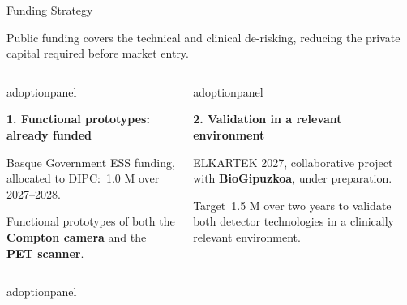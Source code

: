 \documentclass[aspectratio=169,11pt]{beamer}
\newcommand{\hi}[1]{\textcolor{crRed}{#1}}
\begin{document}
\begin{frame}{Funding Strategy}

{\small Public funding covers the technical and clinical de-risking, \hi{reducing the private capital required before market entry}.\par}
\vspace{0.16cm}
\begin{columns}[T,onlytextwidth]
\begin{beamercolorbox}[sep=6pt,wd=\linewidth]{adoptionpanel}
\begin{minipage}[t][2.0cm][t]{\linewidth}\raggedright
{\footnotesize\bfseries\color{crBlue}1. Functional prototypes: already funded\par}
\vspace{0.07cm}
{\scriptsize Basque Government ESS funding, \hi{allocated to DIPC}: \EUR\,1.0 M over 2027--2028.\par\vspace{0.06cm}
Functional prototypes of both the \textbf{Compton camera} and the \textbf{PET scanner}.\par}
\end{minipage}
\end{beamercolorbox}
\begin{beamercolorbox}[sep=6pt,wd=\linewidth]{adoptionpanel}
\begin{minipage}[t][2.0cm][t]{\linewidth}\raggedright
{\footnotesize\bfseries\color{crBlue}2. Validation in a relevant environment\par}
\vspace{0.07cm}
{\scriptsize ELKARTEK 2027, collaborative project with \textbf{BioGipuzkoa}, under preparation.\par\vspace{0.06cm}
Target \EUR\,1.5 M over two years to validate both detector technologies in a clinically relevant environment.\par}
\end{minipage}
\end{beamercolorbox}
\end{columns}
\par\vspace{0.20cm}
\begin{columns}[T,onlytextwidth]
\begin{beamercolorbox}[sep=6pt,wd=\linewidth]{adoptionpanel}
\begin{minipage}[t][2.0cm][t]{\linewidth}\raggedright

\end{minipage}
\end{beamercolorbox}
\end{columns}
\end{frame}
\end{document}
